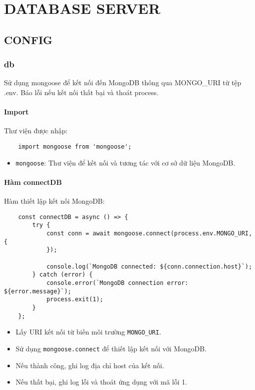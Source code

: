 \chapter{DATABASE SERVER}
    \section{CONFIG}
        \subsection{db}
            \hspace*{0.6cm}Sử dụng mongoose để kết nối đến MongoDB thông qua MONGO\_URI từ tệp .env. Báo lỗi nếu kết nối thất bại và thoát process.
            \subsubsection{Import}
                \hspace*{0.6cm}Thư viện được nhập:
                \begin{lstlisting}
    import mongoose from 'mongoose';
                \end{lstlisting}
                \begin{itemize}
                    \item \texttt{mongoose}: Thư viện để kết nối và tương tác với cơ sở dữ liệu MongoDB.
                \end{itemize}

            \subsubsection{Hàm connectDB}
                \hspace*{0.6cm}Hàm thiết lập kết nối MongoDB:
                \begin{lstlisting}
    const connectDB = async () => {
        try {
            const conn = await mongoose.connect(process.env.MONGO_URI, {
            });

            console.log(`MongoDB connected: ${conn.connection.host}`);
        } catch (error) {
            console.error(`MongoDB connection error: ${error.message}`);
            process.exit(1);
        }
    };
                \end{lstlisting}
                \begin{itemize}
                    \item Lấy URI kết nối từ biến môi trường \texttt{MONGO\_URI}.
                    \item Sử dụng \texttt{mongoose.connect} để thiết lập kết nối với MongoDB.
                    \item Nếu thành công, ghi log địa chỉ host của kết nối.
                    \item Nếu thất bại, ghi log lỗi và thoát ứng dụng với mã lỗi 1.
                \end{itemize}


